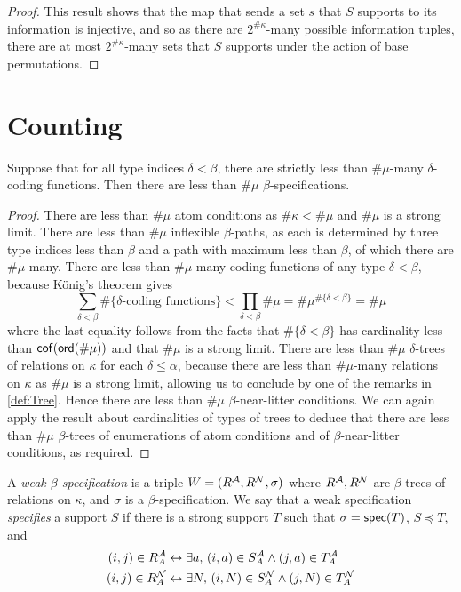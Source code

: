 \begin{proof}
  This result shows that the map that sends a set \( s \) that \( S \) supports to its information is injective, and so as there are \( 2^{\#\kappa} \)-many possible information tuples, there are at most \( 2^{\#\kappa} \)-many sets that \( S \) supports under the action of base permutations.
\end{proof}

\section{Counting}
\begin{proposition}
  \label{prop:card_spec}
  Suppose that for all type indices \( \delta < \beta \), there are strictly less than \( \#\mu \)-many \( \delta \)-coding functions.
  Then there are less than \( \#\mu \) \( \beta \)-specifications.
\end{proposition}
\begin{proof}
  There are less than \( \#\mu \) atom conditions as \( \#\kappa < \#\mu \) and \( \#\mu \) is a strong limit.
  There are less than \( \#\mu \) inflexible \( \beta \)-paths, as each is determined by three type indices less than \( \beta \) and a path with maximum less than \( \beta \), of which there are \( \#\mu \)-many.
  There are less than \( \#\mu \)-many coding functions of any type \( \delta < \beta \), because K\"onig's theorem gives
  \[ \sum_{\delta < \beta} \#\{\delta\text{-coding functions}\} < \prod_{\delta < \beta} \#\mu = \#\mu^{\#\{\delta < \beta\}} = \#\mu \]
  where the last equality follows from the facts that \( \#\{\delta < \beta\} \) has cardinality less than \( \operatorname{\mathsf{cof}}(\operatorname{\mathsf{ord}}(\#\mu)) \) and that \( \#\mu \) is a strong limit.
  There are less than \( \#\mu \) \( \delta \)-trees of relations on \( \kappa \) for each \( \delta \leq \alpha \), because there are less than \( \#\mu \)-many relations on \( \kappa \) as \( \#\mu \) is a strong limit, allowing us to conclude by one of the remarks in \cref{def:Tree}.
  Hence there are less than \( \#\mu \) \( \beta \)-near-litter conditions.
  We can again apply the result about cardinalities of types of trees to deduce that there are less than \( \#\mu \) \( \beta \)-trees of enumerations of atom conditions and of \( \beta \)-near-litter conditions, as required.
\end{proof}
\begin{definition}
  \label{def:WeakSpec}
  A \emph{weak \( \beta \)-specification} is a triple \( W = (R^{\mathcal A}, R^{\mathcal N}, \sigma) \) where \( R^{\mathcal A}, R^{\mathcal N} \) are \( \beta \)-trees of relations on \( \kappa \), and \( \sigma \) is a \( \beta \)-specification.
  We say that a weak specification \emph{specifies} a support \( S \) if there is a strong support \( T \) such that \( \sigma = \operatorname{\mathsf{spec}}(T) \), \( S \preceq T \), and
  \begin{align*}
    (i, j) \in R_A^{\mathcal A} &\leftrightarrow \exists a,\, (i, a) \in S_A^{\mathcal A} \wedge (j, a) \in T_A^{\mathcal A} \\
    (i, j) \in R_A^{\mathcal N} &\leftrightarrow \exists N,\, (i, N) \in S_A^{\mathcal N} \wedge (j, N) \in T_A^{\mathcal N}
  \end{align*}
\end{definition}
